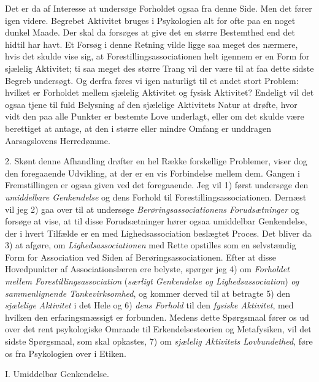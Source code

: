 \documentclass[12pt,a4paper,openany]{book}
\newcommand{\opage}[1]{\marginnote{\footnotesize\textit{[#1]}}}
\begin{document}
Det er da af Interesse at undersøge Forholdet ogsaa fra denne Side. Men det
fører igen videre. Begrebet Aktivitet bruges i Psykologien alt for ofte paa en
noget dunkel Maade. Der skal da forsøges at give det en større Bestemthed end
det hidtil har havt. Et Forsøg i denne Retning vilde ligge saa meget des
nærmere, hvis det skulde vise sig, at Forestillingsassociationen helt igennem
er en Form for sjælelig Aktivitet; ti saa meget des større Trang vil der være
til at faa dette sidste Begreb undersøgt. Og derfra føres vi igen naturligt til
et andet stort Problem: hvilket er Forholdet mellem sjælelig Aktivitet og
fysisk Aktivitet? Endeligt vil det ogsaa tjene til fuld Belysning af den
sjælelige Aktivitets Natur at drøfte, hvor vidt den paa alle Punkter er
bestemte Love underlagt, eller om det skulde være berettiget at antage, at den
i større eller mindre Omfang er unddragen Aarsagslovens Herredømme.

2. Skønt denne Afhandling drøfter en hel Række forskellige Problemer, viser dog
den foregaaende Udvikling, at der er en vis Forbindelse mellem dem. Gangen i
Fremstillingen er ogsaa given ved det foregaaende. Jeg vil 1) først undersøge
den \emph{umiddelbare Genkendelse} og dens Forhold til
Forestillingsassociationen. Dernæst vil jeg 2) gaa over til at undersøge
\emph{Berøringsassociationens Forudsætninger} og forsøge at vise, at til disse
Forudsætninger hører ogsaa umiddelbar Genkendelse, der i hvert Tilfælde er en
med Lighedsassociation beslægtet Proces. Det bliver da 3) at afgøre, om
\emph{Lighedsassociationen} med Rette opstilles som en selvstændig Form for
Association
\setcounter{footnote}{0}%
\opage{8}ved Siden af Berøringsassociationen. Efter at disse Hovedpunkter af
Associationslæren ere belyste, spørger jeg 4) om \emph{Forholdet mellem
Forestillingsassociation} (\emph{særligt Genkendelse og Lighedsassociation})
\emph{og sammenlignende Tankevirksomhed}, og kommer derved til at betragte 5)
den \emph{sjælelige Aktivitet} i det Hele og 6) \emph{dens Forhold} til den
\emph{fysiske Aktivitet}, med hvilken den erfaringsmæssigt er forbunden. Medens
dette Spørgsmaal fører os ud over det rent psykologiske Omraade til
Erkendelsesteorien og Metafysiken, vil det sidste Spørgsmaal, som skal
opkastes, 7) om \emph{sjælelig Aktivitets Lovbundethed}, føre os fra
Psykologien over i Etiken.

\begin{center}\large I. Umiddelbar Genkendelse.\end{center}
\end{document}
